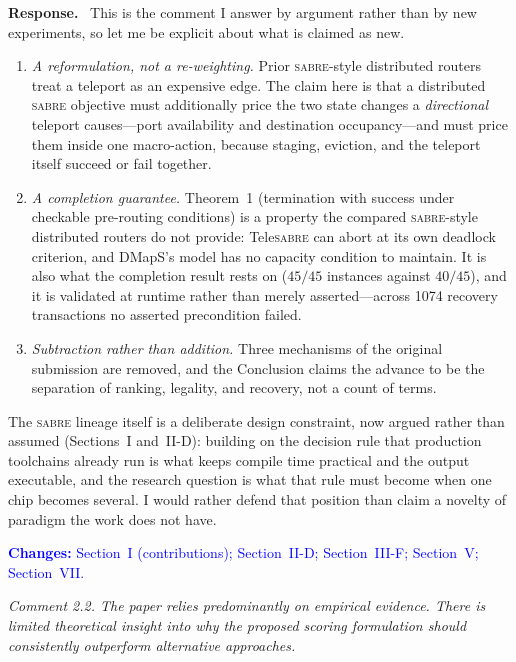 \documentclass[11pt]{article}
\newcommand{\TeleSABRE}{Tele\textsc{sabre}}
\newcommand{\SABRE}{\textsc{sabre}}
\newenvironment{comment}{\medskip\noindent\itshape}{\par}
\newcommand{\response}{\smallskip\noindent\textbf{Response.}\ }
\newcommand{\where}[1]{\textcolor{blue}{\textbf{Changes:} #1}}
\begin{document}
\response
This is the comment I answer by argument rather than by new experiments, so let
me be explicit about what is claimed as new.

\begin{enumerate}[leftmargin=*,itemsep=2pt]
\item \emph{A reformulation, not a re-weighting.} Prior \SABRE{}-style
distributed routers treat a teleport as an expensive edge. The claim here is
that a distributed \SABRE{} objective must additionally price the two state
changes a \emph{directional} teleport causes---port availability and
destination occupancy---and must price them inside one macro-action, because
staging, eviction, and the teleport itself succeed or fail together.
\item \emph{A completion guarantee.} Theorem~1 (termination with success under
checkable pre-routing conditions) is a property the compared \SABRE{}-style
distributed routers do not provide: \TeleSABRE{} can abort at its own deadlock
criterion, and DMapS's model has no capacity condition to maintain. It is also
what the completion result rests on ($45/45$ instances against $40/45$), and
it is validated at runtime rather than merely asserted---across 1074 recovery
transactions no asserted precondition failed.
\item \emph{Subtraction rather than addition.} Three mechanisms of the
original submission are removed, and the Conclusion claims the advance to be
the separation of ranking, legality, and recovery, not a count of terms.
\end{enumerate}

The \SABRE{} lineage itself is a deliberate design constraint, now argued
rather than assumed (Sections~I and~II-D): building on the decision rule that
production toolchains already run is what keeps compile time practical and the
output executable, and the research question is what that rule must become
when one chip becomes several. I would rather defend that position than claim
a novelty of paradigm the work does not have.

\where{Section~I (contributions); Section~II-D; Section~III-F; Section~V;
Section~VII.}

\begin{comment}
Comment 2.2. The paper relies predominantly on empirical evidence. There is
limited theoretical insight into why the proposed scoring formulation should
consistently outperform alternative approaches.
\end{comment}
\end{document}
